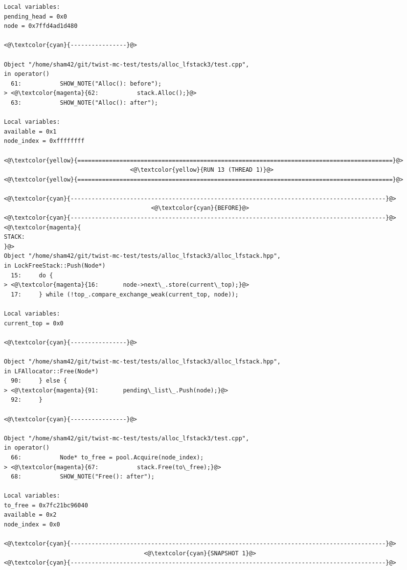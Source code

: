 \begin{adjustwidth}{-3.3cm}{-1cm}
\begin{allintypewriter}
\begin{multicols*}{2}
\begin{lstlisting}[numbers=none]
Local variables: 
pending_head = 0x0
node = 0x7ffd4ad1d480

<@\textcolor{cyan}{----------------}@>

Object "/home/sham42/git/twist-mc-test/tests/alloc_lfstack3/test.cpp",
in operator()
  61:           SHOW_NOTE("Alloc(): before");
> <@\textcolor{magenta}{62:           stack.Alloc();}@>
  63:           SHOW_NOTE("Alloc(): after");

Local variables: 
available = 0x1
node_index = 0xffffffff

<@\textcolor{yellow}{==========================================================================================}@>
                                    <@\textcolor{yellow}{RUN 13 (THREAD 1)}@>
<@\textcolor{yellow}{==========================================================================================}@>

<@\textcolor{cyan}{------------------------------------------------------------------------------------------}@>
                                          <@\textcolor{cyan}{BEFORE}@>
<@\textcolor{cyan}{------------------------------------------------------------------------------------------}@>
<@\textcolor{magenta}{
STACK:
}@>
Object "/home/sham42/git/twist-mc-test/tests/alloc_lfstack3/alloc_lfstack.hpp",
in LockFreeStack::Push(Node*)
  15:     do {
> <@\textcolor{magenta}{16:       node->next\_.store(current\_top);}@>
  17:     } while (!top_.compare_exchange_weak(current_top, node));

Local variables: 
current_top = 0x0

<@\textcolor{cyan}{----------------}@>

Object "/home/sham42/git/twist-mc-test/tests/alloc_lfstack3/alloc_lfstack.hpp",
in LFAllocator::Free(Node*)
  90:     } else {
> <@\textcolor{magenta}{91:       pending\_list\_.Push(node);}@>
  92:     }

<@\textcolor{cyan}{----------------}@>

Object "/home/sham42/git/twist-mc-test/tests/alloc_lfstack3/test.cpp",
in operator()
  66:           Node* to_free = pool.Acquire(node_index);
> <@\textcolor{magenta}{67:           stack.Free(to\_free);}@>
  68:           SHOW_NOTE("Free(): after");

Local variables: 
to_free = 0x7fc21bc96040
available = 0x2
node_index = 0x0

<@\textcolor{cyan}{------------------------------------------------------------------------------------------}@>
                                        <@\textcolor{cyan}{SNAPSHOT 1}@>
<@\textcolor{cyan}{------------------------------------------------------------------------------------------}@>


\end{lstlisting}
\end{multicols*}
\end{allintypewriter}
\end{adjustwidth}
